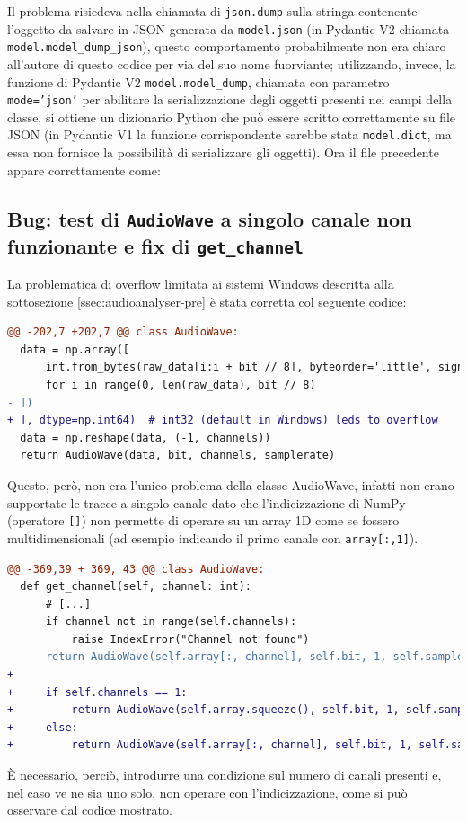 Il problema risiedeva nella chiamata di \texttt{json.dump} sulla stringa contenente l'oggetto da salvare in JSON generata da \texttt{model.json} (in Pydantic V2 chiamata \verb|model.model_dump_json|), questo comportamento probabilmente non era chiaro all'autore di questo codice per via del suo nome fuorviante; utilizzando, invece, la funzione di Pydantic V2 \verb|model.model_dump|, chiamata con parametro \texttt{mode='json'} per abilitare la serializzazione degli oggetti presenti nei campi della classe, si ottiene un dizionario Python che può essere scritto correttamente su file JSON (in Pydantic V1 la funzione corrispondente sarebbe stata \texttt{model.dict}, ma essa non fornisce la possibilità di serializzare gli oggetti).
Ora il file precedente appare correttamente come:



\subsection{Bug: test di \texttt{AudioWave} a singolo canale non funzionante e fix di \texttt{get\_channel}} \label{ssec:mpaicaearp-audiowave}  %
La problematica di overflow limitata ai sistemi Windows descritta alla sottosezione \ref{ssec:audioanalyser-pre} è stata corretta col seguente codice:
\begin{lstlisting}[language=diff]
@@ -202,7 +202,7 @@ class AudioWave:
  data = np.array([
      int.from_bytes(raw_data[i:i + bit // 8], byteorder='little', signed=True)
      for i in range(0, len(raw_data), bit // 8)
- ])
+ ], dtype=np.int64)  # int32 (default in Windows) leds to overflow
  data = np.reshape(data, (-1, channels))
  return AudioWave(data, bit, channels, samplerate)
\end{lstlisting}

Questo, però, non era l'unico problema della classe AudioWave, infatti non erano supportate le tracce a singolo canale dato che l'indicizzazione di NumPy (operatore \texttt{[]}) non permette di operare su un array 1D come se fossero multidimensionali (ad esempio indicando il primo canale con \texttt{array[:,1]}).
\begin{lstlisting}[language=diff]
@@ -369,39 + 369, 43 @@ class AudioWave:
  def get_channel(self, channel: int):
      # [...]
      if channel not in range(self.channels):
          raise IndexError("Channel not found")
-     return AudioWave(self.array[:, channel], self.bit, 1, self.samplerate)
+  
+     if self.channels == 1:
+         return AudioWave(self.array.squeeze(), self.bit, 1, self.samplerate)
+     else:
+         return AudioWave(self.array[:, channel], self.bit, 1, self.samplerate)
\end{lstlisting}
È necessario, perciò, introdurre una condizione sul numero di canali presenti e, nel caso ve ne sia uno solo, non operare con l'indicizzazione, come si può osservare dal codice mostrato.


